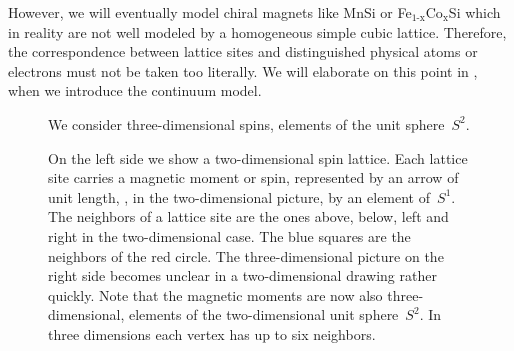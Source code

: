 However, we will eventually model chiral magnets like MnSi or
Fe$_\text{1-x}$Co$_\text{x}$Si which in reality are not well modeled by a
homogeneous simple cubic lattice. Therefore, the correspondence between lattice
sites and distinguished physical atoms or electrons must not be taken too
literally. We will elaborate on this point in , when we
introduce the continuum model.

\begin{figure}
  \centering
  \caption{We consider three-dimensional spins, \ie{} elements of the unit
  sphere~$S^2$.}
\label{fig:s2}
\end{figure}

\begin{figure}
  \centering
  \caption{On the left side we show a two-dimensional spin lattice. Each lattice
  site carries a magnetic moment or spin, represented by an arrow of unit
  length, \ie{}, in the two-dimensional picture, by an element of~$S^1$. The
  neighbors of a lattice site are the ones above, below, left and right in the
  two-dimensional case. The blue squares are the neighbors of the red circle.
  The three-dimensional picture on the right side becomes unclear in a
  two-dimensional drawing rather quickly. Note that the magnetic moments are now
  also three-dimensional, \ie{} elements of the two-dimensional unit
  sphere~$S^2$. In three dimensions each vertex has up to six neighbors.}
\label{fig:lattice}
\end{figure}

